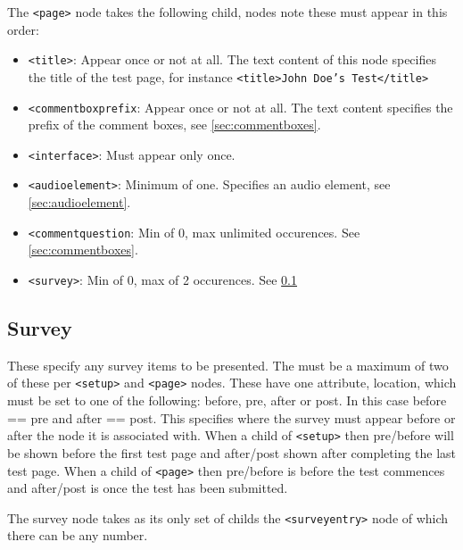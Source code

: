 \documentclass[11pt, oneside]{article}   	%
\begin{document}
        The \texttt{<page>} node takes the following child, nodes note these must appear in this order:
        \begin{itemize}
            \item \texttt{<title>}: Appear once or not at all. The text content of this node specifies the title of the test page, for instance \texttt{<title>John Doe's Test</title>}
            \item \texttt{<commentboxprefix}: Appear once or not at all. The text content specifies the prefix of the comment boxes, see \ref{sec:commentboxes}.
            \item \texttt{<interface>}: Must appear only once.
            \item \texttt{<audioelement>}: Minimum of one. Specifies an audio element, see \ref{sec:audioelement}.
            \item \texttt{<commentquestion}: Min of 0, max unlimited occurences. See \ref{sec:commentboxes}.
            \item \texttt{<survey>}: Min of 0, max of 2 occurences. See \ref{sec:survey}
        \end{itemize}

    \subsection{Survey}
    \label{sec:survey}
        These specify any survey items to be presented. The must be a maximum of two of these per \texttt{<setup>} and \texttt{<page>} nodes. These have one attribute, location, which must be set to one of the following: before, pre, after or post. In this case before == pre and after == post. This specifies where the survey must appear before or after the node it is associated with. When a child of \texttt{<setup>} then pre/before will be shown before the first test page and after/post shown after completing the last test page. When a child of \texttt{<page>} then pre/before is before the test commences and after/post is once the test has been submitted.
        
        The survey node takes as its only set of childs the \texttt{<surveyentry>} node of which there can be any number.
        
\end{document}
